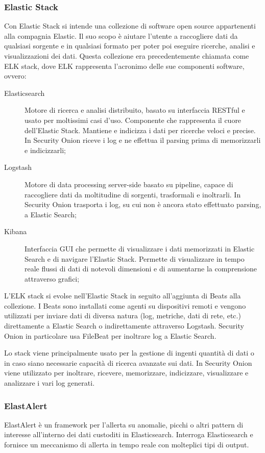 \subsubsection*{Elastic Stack}
Con Elastic Stack \cite{elasticstack} si intende una collezione di software open source appartenenti alla compagnia Elastic.
Il suo scopo è aiutare l'utente a raccogliere dati da qualsiasi sorgente e in qualsiasi formato per poter poi eseguire ricerche, analisi e visualizzazioni dei dati.
Questa collezione era precedentemente chiamata come ELK stack, dove ELK rappresenta l'acronimo delle sue componenti software, ovvero:
\begin{description}
    \item [Elasticsearch] Motore di ricerca e analisi distribuito, basato su interfaccia RESTful e usato per moltissimi casi d'uso. Componente che rappresenta il cuore dell'Elastic Stack. Mantiene e indicizza i  dati per ricerche veloci e precise.
    In Security Onion riceve i log e ne effettua il parsing prima di memorizzarli e indicizzarli;
    \item [Logstash] Motore di data processing server-side basato su pipeline, capace di raccogliere dati da moltitudine di sorgenti, trasformali e inoltrarli.
    In Security Onion trasporta i log, su cui non è ancora stato effettuato parsing,  a Elastic Search;
    \item [Kibana] Interfaccia GUI  che permette di visualizzare i dati memorizzati in Elastic Search e di navigare l'Elastic Stack. Permette di visualizzare in tempo reale flussi di dati di notevoli dimensioni e di aumentarne la comprensione attraverso grafici;
\end{description}

L'ELK stack si evolse nell'Elastic Stack in seguito all'aggiunta di Beats alla collezione.
I Beats sono installati come agenti su dispositivi remoti e vengono utilizzati per inviare dati di diversa natura (log, metriche, dati di rete, etc.) direttamente a Elastic Search  o indirettamente attraverso Logstash. Security Onion in particolare usa FileBeat per inoltrare log a Elastic Search.

Lo stack viene principalmente usato per la gestione di ingenti quantità di dati o in caso siano necessarie capacità di ricerca avanzate sui dati. In Security Onion viene utilizzato per inoltrare, ricevere, memorizzare, indicizzare, visualizzare e analizzare i vari log generati.

\subsubsection*{ElastAlert}
ElastAlert \cite{elastalert} è un framework per l'allerta su anomalie, picchi  o altri pattern di interesse all'interno dei dati custoditi in Elasticsearch. Interroga Elasticsearch e fornisce un meccanismo di allerta in tempo reale con molteplici tipi di output. 

